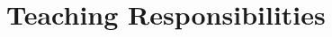 \documentclass[11pt,a4paper,sans]{moderncv} %
\begin{document}
{%










\needspace{6em}%
\section{\textbf{Teaching Responsibilities}}

}
\end{document}
